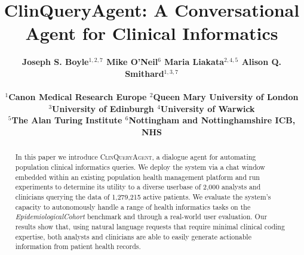 \documentclass[11pt]{article}
\title{ClinQueryAgent: A Conversational Agent for Clinical Informatics}
\author{ \bf
Joseph S. Boyle$^{1,2,7}$ 
Mike O'Neil$^{6}$
Maria Liakata$^{2,4,5}$
Alison Q. Smithard$^{1,3,7}$
\\ \\

$^1$Canon Medical Research Europe $^2$Queen Mary University of London \\ $^3$University of Edinburgh $^4$University of Warwick \\
$^5$The Alan Turing Institute $^6$Nottingham and Nottinghamshire ICB, NHS 
}
\begin{document}



\maketitle
\begin{abstract}
In this paper we introduce \textsc{ClinQueryAgent}, a dialogue agent for automating population clinical informatics queries.
We deploy the system via a chat window embedded within an existing population health management platform and run experiments to determine its utility to a diverse userbase of 2,000 analysts and clinicians querying the data of 1,279,215 active patients.
We evaluate the system's capacity to autonomously handle a range of health informatics tasks on the \textit{EpidemiologicalCohort} benchmark and through a real-world user evaluation.
Our results show that, using natural language requests that require minimal clinical coding expertise, both analysts and clinicians are able to easily generate actionable information from patient health records.




\end{abstract}
\end{document}
